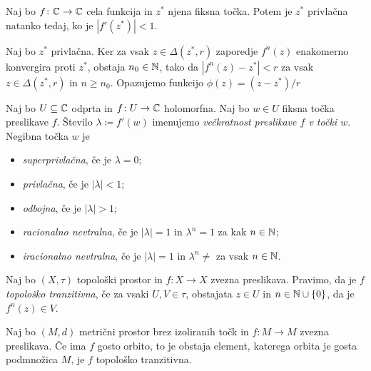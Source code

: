 \begin{izrek}
    Naj bo \(f \colon \mathbb C \to \mathbb C\) cela funkcija in \(z^*\) njena fiksna točka. Potem je \(z^*\) privlačna natanko tedaj, ko je \(|f' (z^*)| < 1\).
\end{izrek}

\begin{dokaz}
    Naj bo \(z^*\) privlačna. Ker za vsak \(z \in \Delta (z^*, r)\) zaporedje \(f^n (z)\) enakomerno konvergira proti \(z^*\), obstaja \(n_0 \in \mathbb N\), tako da \(|f^n (z) - z^*| < r\) za vsak \(z \in \Delta (z^*, r)\) in \(n \geq n_0\). Opazujemo funkcijo \(\phi (z) = (z - z^*) / r\)
\end{dokaz}

\begin{definicija}
    Naj bo \(U \subseteq \mathbb C\) odprta in \(f \colon U \to \mathbb C\) holomorfna. Naj bo \(w \in U\) fiksna točka preslikave \(f\). Število \(\lambda \coloneq f' (w)\) imenujemo \emph{večkratnost preslikave \(f\) v točki \(w\)}. Negibna točka \(w\) je
    \begin{itemize}
        \item \emph{superprivlačna}, če je \(\lambda = 0\);
        \item \emph{privlačna}, če je \(|\lambda| < 1\);
        \item \emph{odbojna}, če je \(|\lambda| > 1\);
        \item \emph{racionalno nevtralna}, če je \(|\lambda| = 1\) in \(\lambda^n = 1\) za kak \(n \in \mathbb N\);
        \item \emph{iracionalno nevtralna}, če je \(|\lambda| = 1\) in \(\lambda^n \neq\) za vsak \(n \in \mathbb N\).
    \end{itemize}
\end{definicija}

\begin{definicija}
    Naj bo \((X, \tau)\) topološki prostor in \(f \colon X \to X\) zvezna preslikava. Pravimo, da je \(f\) \emph{topološko tranzitivna}, če za vsaki \(U, V \in \tau\), obstajata \(z \in U\) in \(n \in \mathbb N \cup \left\{ 0 \right\}\), da je \(f^n (z) \in V\).
\end{definicija}

\begin{trditev}
    Naj bo \((M, d)\) metrični prostor brez izoliranih točk in \(f \colon M \to M\) zvezna preslikava. Če ima \(f\) gosto orbito, to je obstaja element, katerega orbita je gosta podmnožica \(M\), je \(f\) topološko tranzitivna.
\end{trditev}

